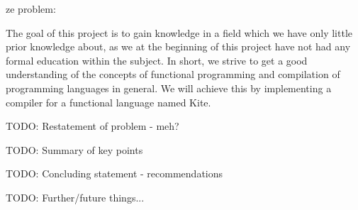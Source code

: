 
ze problem:

The goal of this project is to gain knowledge in a field which we have only little prior knowledge about, as we at the beginning of this project have not had any formal education within the subject. In short, we strive to get a good understanding of the concepts of functional programming and compilation of programming languages in general. We will achieve this by implementing a compiler for a functional language named Kite.


TODO: Restatement of problem - meh?

TODO: Summary of key points

TODO: Concluding statement - recommendations

TODO: Further/future things...
